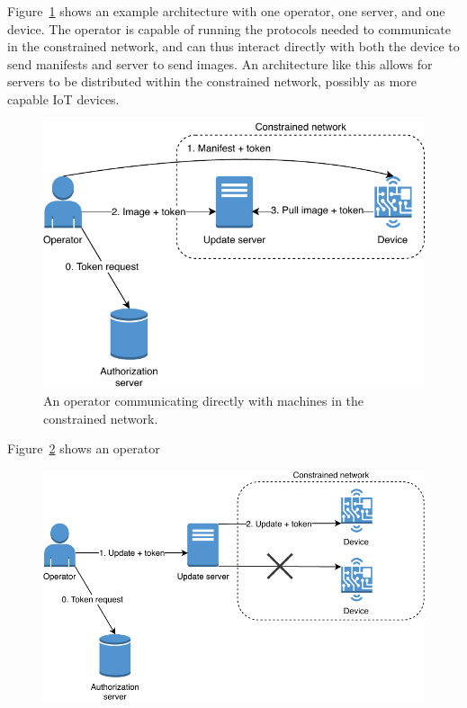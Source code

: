 \documentclass[0-thesis.tex]{subfiles}
\begin{document}
Figure~\ref{fig:operator-direct} shows an example architecture with one operator, one
server, and one device. The operator is capable of running the protocols needed to
communicate in the constrained network, and can thus interact directly with both the
device to send manifests and server to send images. An architecture like this allows for
servers to be distributed within the constrained network, possibly as more capable IoT
devices.

\begin{figure}
    \caption{An operator communicating directly with machines in the constrained network.}
    \label{fig:operator-direct}
    \includegraphics{images/operator-direct.pdf}
\end{figure}

Figure~\ref{fig:operator-proxy} shows an operator 

\begin{figure}
    \caption{}
    \label{fig:operator-proxy}
    \includegraphics{images/operator-indirect.pdf}
\end{figure}
\end{document}
